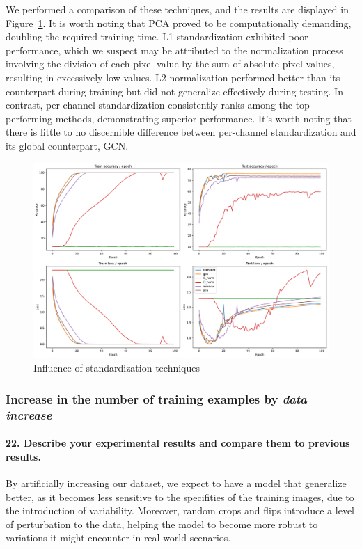 \documentclass{article}
\theoremstyle{plain}%
\theoremstyle{definition}
\theoremstyle{remark}
\begin{document}
We performed a comparison of these techniques, and the results are displayed in Figure~\ref{fig:standardization_influence}. It is worth noting that PCA proved to be computationally demanding, doubling the required training time. L1 standardization exhibited poor performance, which we suspect may be attributed to the normalization process involving the division of each pixel value by the sum of absolute pixel values, resulting in excessively low values. L2 normalization performed better than its counterpart during training but did not generalize effectively during testing. In contrast, per-channel standardization consistently ranks among the top-performing methods, demonstrating superior performance. It's worth noting that there is little to no discernible difference between per-channel standardization and its global counterpart, GCN.

\begin{figure}[H]
    \centering
    \includegraphics*[width=\textwidth]{figs/CNN/standardization_influence.pdf}
    \caption{Influence of standardization techniques}
    \label{fig:standardization_influence}
\end{figure}

\subsubsection{Increase in the number of training examples by \textit{data increase}}
\paragraph{22. Describe your experimental results and compare them to previous results.}

By artificially increasing our dataset, we expect to have a model that generalize better, as it becomes less sensitive to the specifities of the training images, due to the introduction of variability. Moreover, random crops and flips introduce a level of perturbation to the data, helping the model to become more robust to variations it might encounter in real-world scenarios.
\end{document}
